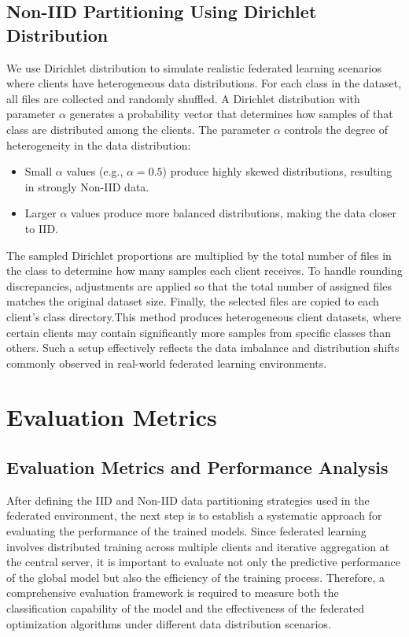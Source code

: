\documentclass[12pt]{book}
\begin{document}
\subsection{Non-IID Partitioning Using Dirichlet Distribution}

We use Dirichlet distribution to simulate realistic federated learning scenarios where clients have heterogeneous data distributions. For each class in the dataset, all files are collected and randomly shuffled. A Dirichlet distribution with parameter $\alpha$ generates a probability vector that determines how samples of that class are distributed among the clients. The parameter $\alpha$ controls the degree of heterogeneity in the data distribution:

\begin{itemize}
    \item Small $\alpha$ values (e.g., $\alpha = 0.5$) produce highly skewed distributions, resulting in strongly Non-IID data.
    \item Larger $\alpha$ values produce more balanced distributions, making the data closer to IID.
\end{itemize}

The sampled Dirichlet proportions are multiplied by the total number of files in the class to determine how many samples each client receives. To handle rounding discrepancies, adjustments are applied so that the total number of assigned files matches the original dataset size. Finally, the selected files are copied to each client’s class directory.This method produces heterogeneous client datasets, where certain clients may contain significantly more samples from specific classes than others. Such a setup effectively reflects the data imbalance and distribution shifts commonly observed in real-world federated learning environments.


\section{Evaluation Metrics}

\subsection{Evaluation Metrics and Performance Analysis}

After defining the IID and Non-IID data partitioning strategies used in the federated environment, the next step is to establish a systematic approach for evaluating the performance of the trained models. Since federated learning involves distributed training across multiple clients and iterative aggregation at the central server, it is important to evaluate not only the predictive performance of the global model but also the efficiency of the training process. Therefore, a comprehensive evaluation framework is required to measure both the classification capability of the model and the effectiveness of the federated optimization algorithms under different data distribution scenarios.
\end{document}
